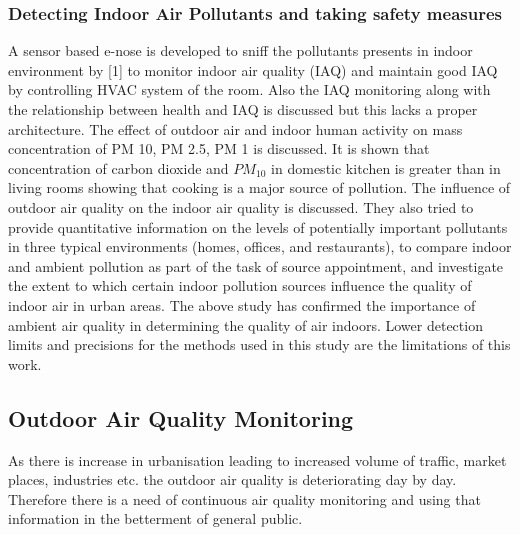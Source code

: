 \subsubsection{Detecting Indoor Air Pollutants and taking safety measures}
A sensor based e-nose is developed to sniff the pollutants presents in indoor environment by [1] to monitor indoor air quality (IAQ) and maintain good IAQ by controlling HVAC system of the room. Also the IAQ monitoring along with the relationship between health and IAQ is discussed but this lacks a proper architecture. The effect of outdoor air and indoor human activity on mass concentration of PM 10, PM 2.5, PM 1 is discussed. It is shown that concentration of carbon dioxide and $PM_{10}$ in domestic kitchen is greater than in living rooms showing that cooking is a major source of pollution. The influence of outdoor air quality on the indoor air quality is discussed. They also tried to provide quantitative information on the levels of potentially important pollutants in three typical environments (homes, offices, and restaurants), to compare indoor and ambient pollution as part of the task of source appointment, and investigate the extent to which certain indoor pollution sources influence the quality of indoor air in urban areas. The above study has confirmed the importance of ambient air quality in determining the quality of air indoors. Lower detection limits and precisions for the methods used in this study are the limitations of this work.

\subsection{Outdoor Air Quality Monitoring}
As there is increase in urbanisation leading to increased volume of traffic, market places, industries etc. the outdoor air quality is deteriorating day by day. Therefore there is a need of continuous air quality monitoring and using that information in the betterment of general public.

